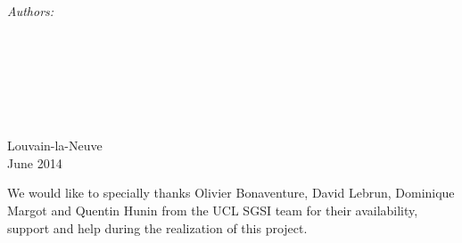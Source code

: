 \documentclass[11pt, a4paper, twoside, openright]{Packages/Thesis}
\begin{document}
\begin{titlepage}
\begin{center}
\begin{minipage}{0.4\textwidth}
\begin{center} \large
\emph{Authors:}\\
{\authornames} %
\end{center}
\end{minipage}
\\[3cm]
\\
\\
\\
\\
\\[1.5cm] %
 
{\large Louvain-la-Neuve\\ June 2014}\\[4cm] %
 
\vfill
\end{center}

\end{titlepage}

\cleardoublepage
\pagestyle{empty} %

\null\vfill %

We would like to specially thanks Olivier Bonaventure, David Lebrun, Dominique Margot and Quentin Hunin from the UCL SGSI team  for their availability, support and help during the realization of this project.


\vfill\vfill\vfill\vfill\vfill\vfill\null %

\clearpage %
\end{document}
